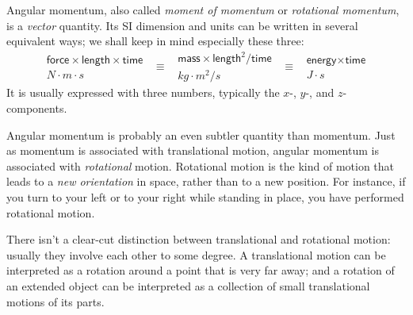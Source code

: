 \documentclass[a4paper,12pt,%
onecolumn,oneside,%
british%
]{memoir}
\renewcommand*{\|}[1][]{\nonscript\:#1\vert\nonscript\:\mathopen{}}
\begin{document}
Angular momentum, also called \emph{moment of momentum} or \emph{rotational momentum}, is a \emph{vector} quantity. Its SI dimension and units can be written in several equivalent ways; we shall keep in mind especially these three:
\begin{equation*}
  \begin{gathered}
    \textsf{force}\times\textsf{length}\times\textsf{time}
    \\\unit{N\cdot m\cdot s}
  \end{gathered}
\enspace  \equiv\enspace
  \begin{gathered}
  \textsf{mass}\times\textsf{length}^{2}/\textsf{time}
    \\\unit{kg\cdot m^{2}/s}
  \end{gathered}
\enspace  \equiv\enspace
  \begin{gathered}
  \textsf{energy}\times\textsf{time}
    \\\unit{J\cdot s}
  \end{gathered}
\end{equation*}
It is usually expressed with three numbers, typically the $x$-, $y$-, and $z$-components.

Angular momentum is probably an even subtler quantity than momentum. Just as momentum is associated with translational motion, angular momentum is associated with \emph{rotational} motion. Rotational motion is the kind of motion that leads to a \emph{new orientation} in space, rather than to a new position. For instance, if you turn to your left or to your right while standing in place, you have performed rotational motion.

There isn't a clear-cut distinction between translational and rotational motion: usually they involve each other to some degree. A translational motion can be interpreted as a rotation around a point that is very far away; and a rotation of an extended object can be interpreted as a collection of small translational motions of its parts.
\end{document}
